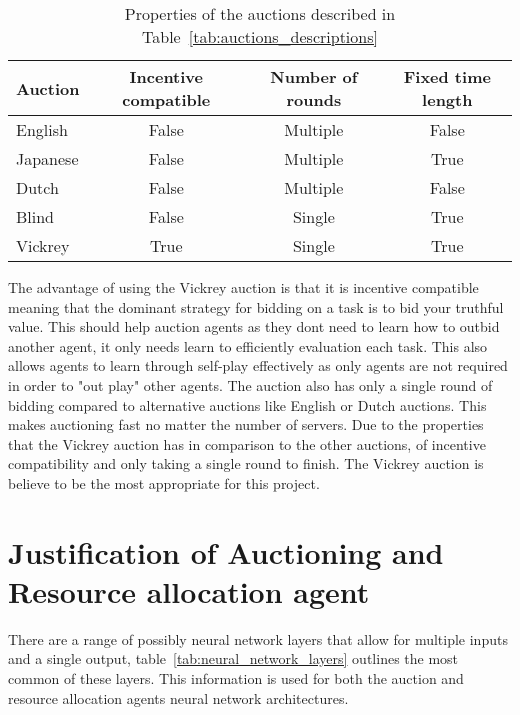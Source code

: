 \begin{table}[h]
    \centering
    \begin{tabular}{|l|c|c|c|} \hline
        Auction  & Incentive compatible & Number of rounds & Fixed time length\\ \hline
        English  & False                & Multiple         & False            \\ \hline
        Japanese & False                & Multiple         & True             \\ \hline
        Dutch    & False                & Multiple         & False            \\ \hline
        Blind    & False                & Single           & True             \\ \hline
        Vickrey  & True                 & Single           & True             \\ \hline
    \end{tabular}
    \caption{Properties of the auctions described in Table~\ref{tab:auctions_descriptions}}
    \label{tab:auction_properties}
\end{table}

The advantage of using the Vickrey auction is that it is incentive compatible meaning that the dominant strategy for
bidding on a task is to bid your truthful value. This should help auction agents as they dont need to learn how to
outbid another agent, it only needs learn to efficiently evaluation each task. This also allows agents to learn through
self-play effectively as only agents are not required in order to "out play" other agents. The auction also has only a
single round of bidding compared to alternative auctions like English or Dutch auctions. This makes auctioning fast
no matter the number of servers. Due to the properties that the Vickrey auction has in comparison to the other auctions,
of incentive compatibility and only taking a single round to finish. The Vickrey auction is believe to be the most
appropriate for this project.

\section{Justification of Auctioning and Resource allocation agent}\label{sec:justification-of-auctioning-and-resource-allocation-agent}
There are a range of possibly neural network layers that allow for multiple inputs and a single output,
table~\ref{tab:neural_network_layers} outlines the most common of these layers. This information is used for both the
auction and resource allocation agents neural network architectures.

